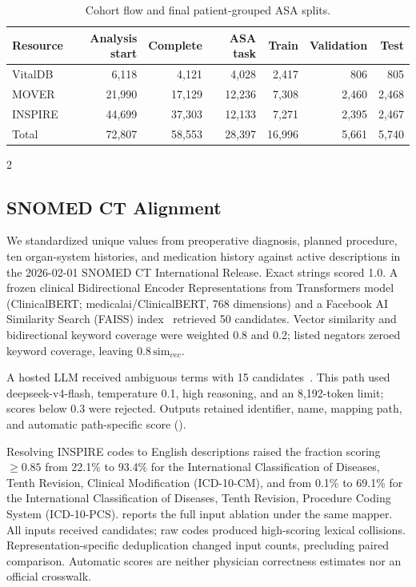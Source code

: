 \documentclass[a4paper,conference]{IEEEtran}
\newcommand{\fieldname}[1]{{\normalfont #1}}
\begin{document}
\begin{table}[H]
\caption{Cohort flow and final patient-grouped ASA splits.}
\label{tab:cohort-flow-full}
\centering\small
\begin{tabular}{lrrrrrr}
\toprule
Resource & Analysis start & Complete & ASA task & Train & Validation & Test \\
\midrule
VitalDB & 6,118 & 4,121 & 4,028 & 2,417 & 806 & 805 \\
MOVER & 21,990 & 17,129 & 12,236 & 7,308 & 2,460 & 2,468 \\
INSPIRE & 44,699 & 37,303 & 12,133 & 7,271 & 2,395 & 2,467 \\
Total & 72,807 & 58,553 & 28,397 & 16,996 & 5,661 & 5,740 \\
\bottomrule
\end{tabular}
\end{table}\begin{multicols}{2}
\subsection{SNOMED CT Alignment}
We standardized unique values from preoperative diagnosis, planned procedure, ten organ-system histories, and medication history against active descriptions in the 2026-02-01 SNOMED CT International Release. Exact strings scored 1.0. A frozen clinical Bidirectional Encoder Representations from Transformers model (\mbox{ClinicalBERT}; \fieldname{medicalai/ClinicalBERT}, 768 dimensions) and a Facebook AI Similarity Search (FAISS) index~\cite{faiss} retrieved 50 candidates. Vector similarity and bidirectional keyword coverage were weighted 0.8 and 0.2; listed negators zeroed keyword coverage, leaving $0.8\,\mathrm{sim}_{vec}$.

A hosted LLM received ambiguous terms with 15 candidates~\cite{rag}. This path used deepseek-v4-flash, temperature 0.1, high reasoning, and an 8,192-token limit; scores below 0.3 were rejected. Outputs retained identifier, name, mapping path, and automatic path-specific score ().

Resolving INSPIRE codes to English descriptions raised the fraction scoring $\geq0.85$ from 22.1\% to 93.4\% for the International Classification of Diseases, Tenth Revision, Clinical Modification (\mbox{ICD-10-CM}), and from 0.1\% to 69.1\% for the International Classification of Diseases, Tenth Revision, Procedure Coding System (\mbox{ICD-10-PCS}).  reports the full input ablation under the same mapper. All inputs received candidates; raw codes produced high-scoring lexical collisions. Representation-specific deduplication changed input counts, precluding paired comparison. Automatic scores are neither physician correctness estimates nor an official crosswalk.


\end{multicols}
\end{document}
